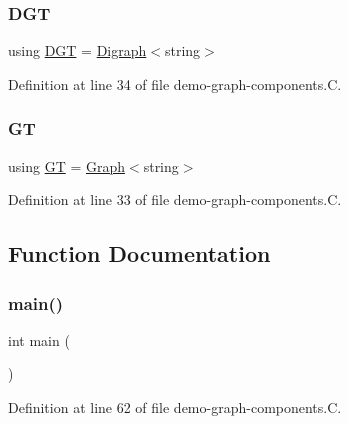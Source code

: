 \subsubsection{\texorpdfstring{D\+GT}{DGT}}
{\footnotesize\ttfamily using \hyperlink{demo-buildgraph_8_c_ae73e956c2a8cf0a58255aa6b659985e0}{D\+GT} =  \hyperlink{class_designar_1_1_digraph}{Digraph}$<$string$>$}



Definition at line 34 of file demo-\/graph-\/components.\+C.

\mbox{\label{demo-graph-components_8_c_a668102de43ec3f9488fff7b515d48859}} 
\subsubsection{\texorpdfstring{GT}{GT}}
{\footnotesize\ttfamily using \hyperlink{demo-buildgraph_8_c_a3001c40d2c31ca87ed96cd7d1334a55e}{GT} =  \hyperlink{class_designar_1_1_graph}{Graph}$<$string$>$}



Definition at line 33 of file demo-\/graph-\/components.\+C.



\subsection{Function Documentation}
\mbox{\label{demo-graph-components_8_c_ae66f6b31b5ad750f1fe042a706a4e3d4}} 
\subsubsection{\texorpdfstring{main()}{main()}}
{\footnotesize\ttfamily int main (\begin{DoxyParamCaption}{ }\end{DoxyParamCaption})}



Definition at line 62 of file demo-\/graph-\/components.\+C.

\mbox{\label{demo-graph-components_8_c_af4aa6ad85cbef3cd03726e2b31004df6}} 
